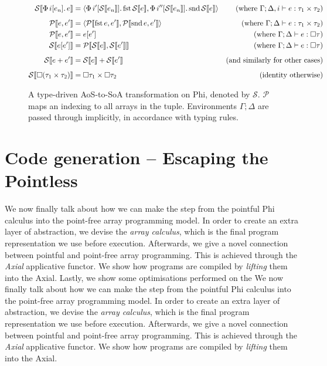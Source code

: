 \begin{figure}[h]
    \centering
    \begin{align*}
\phisoa {\phivec{i}{e_n}{e}}
&= \phipair{\phivec{i'}{\phisoa{e_n}}{\phifst{\phisoa{e}}}}{\phivec{i''}{\phisoa{e_n}}{\phisnd{\phisoa{e}}}}
&\text{(where }\Gamma; \Delta, i \vdash e : \phipairtype{\tau_1}{\tau_2} \text{)} \\[0.5em]
\phitupleindex{e}{e'}
&= \phipair{\phitupleindex{\phifst{e}}{e'}}{\phitupleindex{\phisnd{e}}{e'}}
&\text{(where }\Gamma; \Delta \vdash e : \phipairtype{\tau_1}{\tau_2} \text{)} \\
\phitupleindex{e}{e'}
&= e\left[ e' \right]
&\text{(where }\Gamma; \Delta \vdash e : \phivectype{\tau} \text{)} \\
\phisoa{e[e']}
&= \phitupleindex{\phisoa{e}}{\phisoa{e'}}
&\text{(where }\Gamma; \Delta \vdash e : \phivectype{\tau} \text{)} \\[0.5em]
\phisoa{e + e'}
&= \phisoa{e} + \phisoa{e'}
&\text{(and similarly for other cases)} \\[0.5em]
\phisoa{\phivectype{(\phipairtype{\tau_1}{\tau_2}})} &= \phipairtype{\phivectype{\tau_1}}{\phivectype{\tau_2}} &\text{(identity otherwise)}
    \end{align*}
    \caption{A type-driven AoS-to-SoA transformation on Phi, denoted by $\mathcal S$. $\mathcal P$ maps an indexing to all arrays in the tuple. Environments $\Gamma; \Delta$ are passed through implicitly, in accordance with typing rules.}
    \label{fig:aos-to-soa}
\end{figure}

\section{Code generation -- Escaping the Pointless}
\label{escaping-the-pointless}

We now finally talk about how we can make the step from the pointful Phi calculus into the point-free array programming model. In order to create an extra layer of abstraction, we devise the \textit{array calculus}, which is the final program representation we use before execution. Afterwards, we give a novel connection between pointful and point-free array programming. This is achieved through the \textit{Axial} applicative functor. We show how programs are compiled by \textit{lifting} them into the Axial. Lastly, we show some optimisations performed on the 
We now finally talk about how we can make the step from the pointful Phi calculus into the point-free array programming model. In order to create an extra layer of abstraction, we devise the \textit{array calculus}, which is the final program representation we use before execution. Afterwards, we give a novel connection between pointful and point-free array programming. This is achieved through the \textit{Axial} applicative functor. We show how programs are compiled by \textit{lifting} them into the Axial.

